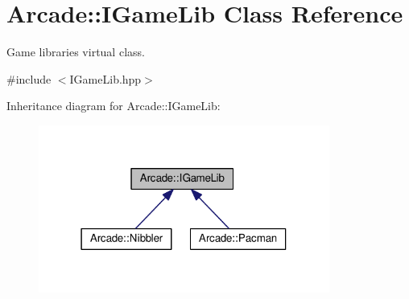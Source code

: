 \hypertarget{class_arcade_1_1_i_game_lib}{}\section{Arcade\+:\+:I\+Game\+Lib Class Reference}
\label{class_arcade_1_1_i_game_lib}


Game libraries virtual class.  




{\ttfamily \#include $<$I\+Game\+Lib.\+hpp$>$}



Inheritance diagram for Arcade\+:\+:I\+Game\+Lib\+:
\nopagebreak
\begin{figure}[H]
\begin{center}
\leavevmode
\includegraphics[width=271pt]{class_arcade_1_1_i_game_lib__inherit__graph}
\end{center}
\end{figure}
